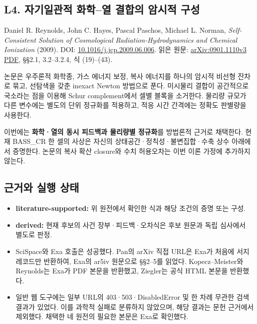 \documentclass[11pt,a4paper]{article}
\providecommand{\tightlist}{\setlength{\itemsep}{2pt}\setlength{\parskip}{0pt}}
\begin{document}
\hypertarget{l4.-uxc790uxae30uxc77cuxad00uxc801-uxd654uxd559uxc5f4-uxacb0uxd569uxc758-uxc554uxc2dcuxc801-uxad6cuxc131}{%
\subsection{L4. 자기일관적 화학--열 결합의 암시적 구성}\label{l4.-uxc790uxae30uxc77cuxad00uxc801-uxd654uxd559uxc5f4-uxacb0uxd569uxc758-uxc554uxc2dcuxc801-uxad6cuxc131}}

Daniel R. Reynolds, John C. Hayes, Pascal Paschos, Michael L. Norman, \emph{Self-Consistent Solution of Cosmological Radiation-Hydrodynamics and Chemical Ionization} (2009). DOI: \href{https://doi.org/10.1016/j.jcp.2009.06.006}{10.1016/j.jcp.2009.06.006}. 읽은 원문: \href{https://arxiv.org/pdf/0901.1110}{arXiv:0901.1110v3 PDF}, §§2.1, 3.2--3.2.4, 식 (19)--(43).

논문은 우주론적 화학종, 가스 에너지 보정, 복사 에너지를 하나의 암시적 비선형 잔차로 묶고, 선탐색을 갖춘 inexact Newton 방법으로 푼다. 미시물리 결합이 공간적으로 국소라는 점을 이용해 Schur complement에서 셀별 블록을 소거한다. 물리량 규모가 다른 변수에는 별도의 단위 정규화를 적용하고, 적응 시간 간격에는 정확도 판별량을 사용한다.

이번에는 \textbf{화학·열의 동시 피드백과 물리량별 정규화}를 방법론적 근거로 채택한다. 현재 BASS\_CR 한 셀의 사상은 자신의 상태공간·정칙성·불변집합·수축 상수 아래에서 증명한다. 논문의 복사 확산 closure와 수치 허용오차는 이번 이론 가정에 추가하지 않는다.

\hypertarget{uxadfcuxac70uxc640-uxc2e4uxd589-uxc0c1uxd0dc}{%
\subsection{근거와 실행 상태}\label{uxadfcuxac70uxc640-uxc2e4uxd589-uxc0c1uxd0dc}}

\begin{itemize}
\tightlist
\item
  \textbf{literature-supported:} 위 원전에서 확인한 식과 해당 조건의 증명 또는 구성.
\item
  \textbf{derived:} 현재 후보의 사건 장부·피드백·오차식은 후보 원문과 독립 심사에서 별도로 판정.
\item
  SciSpace와 Exa 호출은 성공했다. Pan의 arXiv 직접 URL은 Exa가 처음에 서지 레코드만 반환하여, Exa의 ar5iv 원문으로 §§2--5를 읽었다. Kopecz--Meister와 Reynolds는 Exa가 PDF 본문을 반환했고, Ziegler는 공식 HTML 본문을 반환했다.
\item
  일반 웹 도구에는 일부 URL의 403·503·DisabledError 및 한 차례 무관한 검색 결과가 있었다. 이를 과학적 실패로 분류하지 않았으며, 해당 결과는 문헌 근거에서 제외했다. 채택한 네 원전의 필요한 본문은 Exa로 확인했다.
\end{itemize}
\end{document}
